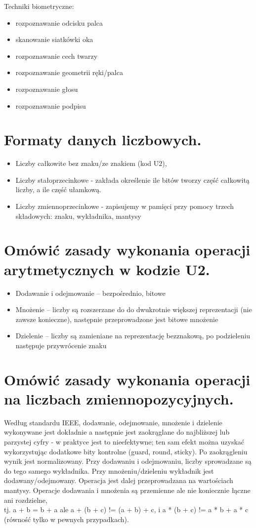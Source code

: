 \documentclass[12pt,a4paper]{article}
\begin{document}
Techniki biometryczne:
	\begin{itemize}
		\item rozpoznawanie odcisku palca
		\item skanowanie siatkówki oka
		\item rozpoznawanie cech twarzy
		\item rozpoznawanie geometrii ręki/palca
		\item rozpoznawanie głosu
		\item rozpoznawanie podpisu
	\end{itemize}

	\section{Formaty danych liczbowych.}
	\begin{itemize}
		\item Liczby całkowite bez znaku/ze znakiem (kod U2), 
		\item Liczby stałoprzecinkowe - zakłada określenie ile bitów tworzy część całkowitą liczby, a ile część ułamkową. 
		\item Liczby zmiennoprzecinkowe - zapisujemy w pamięci przy pomocy trzech składowych: znaku, wykładnika, mantysy
	\end{itemize}

	\section{Omówić zasady wykonania operacji arytmetycznych w kodzie U2.}
	\begin{itemize}
		\item Dodawanie i odejmowanie -- bezpośrednio, bitowe
		\item Mnożenie -- liczby są rozszerzane do do dwukrotnie większej reprezentacji (nie zawsze konieczne), następnie przeprowadzone jest bitowe mnożenie
		\item Dzielenie -- liczby są zamieniane na reprezentację bezznakową, po podzieleniu następuje przywrócenie znaku
\end{itemize}		

	\section{Omówić zasady wykonania operacji na liczbach zmiennopozycyjnych.}
	Według standardu IEEE, dodawanie, odejmowanie, mnożenie i dzielenie wykonywane jest dokładnie a następnie jest zaokrąglane do najbliższej lub parzystej cyfry - w praktyce jest to nieefektywne; ten sam efekt można uzyskać wykorzystując dodatkowe bity kontrolne (guard, round, sticky). Po zaokrągleniu wynik jest normalizowany. Przy dodawaniu i odejmowaniu, liczby sprowadzane są do tego samego wykładnika. Przy mnożeniu/dzieleniu wykładnik jest dodawany/odejmowany. Operacja jest dalej przeprowadzana na wartościach mantysy. Operacje dodawania i mnożenia są przemienne ale nie koniecznie łączne ani rozdzielne,\\tj. a + b = b + a ale a + (b + c) != (a + b) + c, i a * (b + c) != a * b + a * c (równość tylko w pewnych przypadkach).
\end{document}
